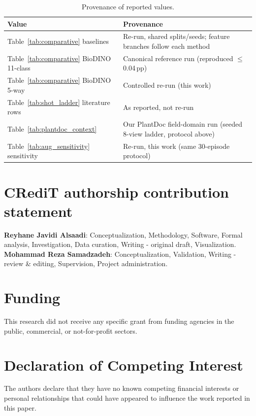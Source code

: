 \documentclass[preprint,12pt]{elsarticle}
\begin{document}
\begin{table}[htbp]
\caption{Provenance of reported values.}
\label{tab:provenance}
\centering

\footnotesize
\begin{tabularx}{\columnwidth}{l X}
\toprule
\textbf{Value} & \textbf{Provenance} \\
\midrule
Table~\ref{tab:comparative} baselines & Re-run, shared splits/seeds; feature branches follow each method \\
Table~\ref{tab:comparative} BioDINO 11-class & Canonical reference run (reproduced $\le$0.04\,pp) \\
Table~\ref{tab:comparative} BioDINO 5-way & Controlled re-run (this work) \\
Table~\ref{tab:shot_ladder} literature rows & As reported, not re-run \\
Table~\ref{tab:plantdoc_context} & Our PlantDoc field-domain run (seeded 8-view ladder, protocol above) \\
Table~\ref{tab:aug_sensitivity} sensitivity & Re-run, this work (same 30-episode protocol) \\
\bottomrule
\end{tabularx}
\end{table}
\section*{CRediT authorship contribution statement}
\textbf{Reyhane Javidi Alsaadi}: Conceptualization, Methodology, Software, Formal analysis, Investigation, Data curation, Writing - original draft, Visualization.
\textbf{Mohammad Reza Samadzadeh}: Conceptualization, Validation, Writing - review \& editing, Supervision, Project administration.

\section*{Funding}
This research did not receive any specific grant from funding agencies in the public, commercial, or not-for-profit sectors.

\section*{Declaration of Competing Interest}
The authors declare that they have no known competing financial interests or personal relationships that could have appeared to influence the work reported in this paper.
\end{document}
